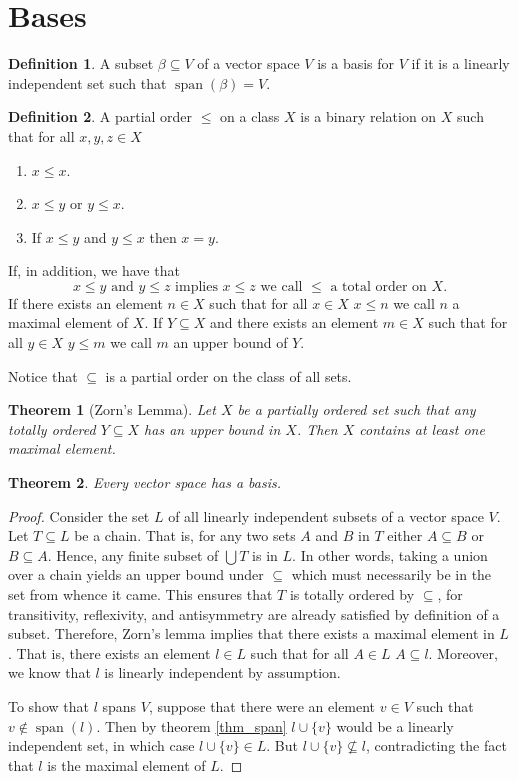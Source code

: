 \documentclass[oneside, 12pt]{book}
\DeclareMathOperator{\spn}{span}
\newtheorem{thm}{Theorem}[section]
\theoremstyle{definition}
\newtheorem{defn}{Definition}[section]
\begin{document}
\section{Bases}
\begin{defn}
\label{defn_basis}
A subset $\beta \subseteq V $ of a vector space $V$ is a basis for $V$ if it is a linearly independent set such that $\spn(\beta)=V$.
\end{defn}
\begin{defn}
\label{defn_pset}
  A partial order $\leq$ on a class $X$ is a binary relation on $X$ such that for all $x,y,z \in X$
  \begin{enumerate}
    \item $x \leq x$.
    \item $x \leq y$ or $y \leq x$.
    \item If $x \leq y$ and $y \leq x$ then $x=y$.
  \end{enumerate}
  If, in addition, we have that \[ x \leq y \text{ and } y \leq z  \text{ implies } x \leq z  \text{ we call } \leq \text{ a total order on } X.\]
  If there exists an element $n \in X$ such that for all $x \in X$ $x \leq n$ we call $n$ a maximal element of $X$.
  If $Y \subseteq X$ and there exists an element $m \in X$ such that for all $y \in X$ $y \leq m$ we call $m$ an upper bound of $Y$.
\end{defn}
Notice that $\subseteq$ is a partial order on the class of all sets.
\begin{thm}[Zorn's Lemma]
Let $X$ be a partially ordered set such that any totally ordered $Y \subseteq X$ has an upper bound in $X$. Then $X$ contains at least one maximal element.
\end{thm}
\begin{thm}
\label{thm_basis}
Every vector space has a basis.
\end{thm}
\begin{proof}
  Consider the set $L$ of all linearly independent subsets of a vector space $V$. Let $T \subseteq L$ be a chain. That is, for any two sets $A$ and $B$ in $T$ either $A \subseteq B$ or $B \subseteq A$. Hence, any finite subset of $\bigcup T$ is in $L$. In other words, taking a union over a chain yields an upper bound under $\subseteq$ which must necessarily be in the set from whence it came. This ensures that $T$ is totally ordered by $\subseteq$, for transitivity, reflexivity, and antisymmetry are already satisfied by definition of a subset. Therefore, Zorn's lemma implies that there exists a maximal element in $L$. That is, there exists an element $l \in L$ such that for all $A \in L$ $A \subseteq l$. Moreover, we know that $l$ is linearly independent by assumption.

  To show that $l$ spans $V$, suppose that there were an element $v \in V$ such that $v\notin \spn(l)$. Then by theorem \ref{thm_span} $l \cup \{v\}$ would be a linearly independent set, in which case $l \cup \{v\} \in L $. But $l \cup \{v \} \nsubseteq l$, contradicting the fact that $l$ is the maximal element of $L$.
\end{proof}
\end{document}
